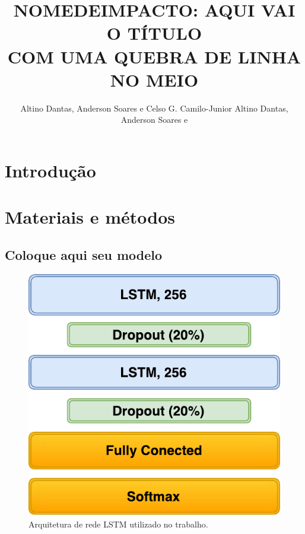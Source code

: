 \documentclass[isoft]{ufgposter}
\title{\uppercase{NomeDeImpacto: Aqui vai o título \\ com uma quebra de linha no meio}}
\author{Altino Dantas, Anderson Soares e Celso G. Camilo-Junior Altino Dantas, Anderson Soares e }
\begin{document}
\begin{poster}


\section{Introdução}

\lipsum[3-4]

\section{Materiais e métodos}%

\subsection{Coloque aqui seu modelo}

\lipsum[11]

\vspace{1cm}

\begin{figure}
\centering
\captionsetup{type=figure}
\includegraphics[scale=2]{lstm}
\caption{Arquitetura de rede LSTM utilizado no trabalho.}
\label{fig:lstm}
\end{figure}


\end{poster}
\end{document}

